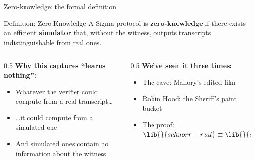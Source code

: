 \ifdefined\PRESENTATION\else\PassOptionsToClass{handout}{beamer}\fi\documentclass[aspectratio=169, lualatex]{beamer}
\begin{document}
\begin{frame}{Zero-knowledge: the formal definition}
	\begin{block}{Definition: Zero-Knowledge}
		A Sigma protocol is \textbf{zero-knowledge} if there exists an efficient \textbf{simulator} that, without the witness, outputs transcripts indistinguishable from real ones.
	\end{block}
	\begin{columns}[T]
		\begin{column}{0.5\textwidth}
			\textbf{Why this captures ``learns nothing'':}
			\begin{itemize}
				\item Whatever the verifier could compute from a real transcript\ldots
				\item \ldots it could compute from a simulated one
				\item And simulated ones contain no information about the witness
			\end{itemize}
		\end{column}
		\begin{column}{0.5\textwidth}
			\textbf{We've seen it three times:}
			\begin{itemize}
				\item The cave: Mallory's edited film
				\item Robin Hood: the Sheriff's paint bucket
				\item The proof: $\lib{}{schnorr-real} \equiv \lib{}{schnorr-fake}$
			\end{itemize}
		\end{column}
	\end{columns}
\end{frame}
\end{document}
